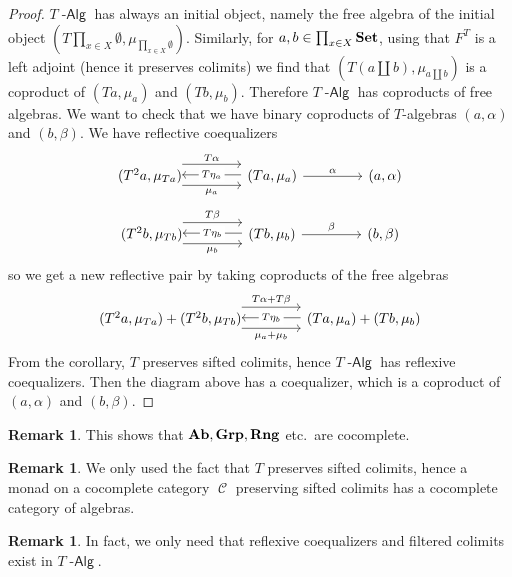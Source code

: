 \documentclass[a4paper,11pt,oneside,openany]{scrbook}
\newcommand{\catname}[1]{{\normalfont\textbf{#1}}}
\DeclareMathOperator{\Alg}{-\mathsf{Alg}}
\newcommand{\Set}{\catname{Set}}
\newcommand{\Ab}{\catname{Ab}}
\DeclareMathOperator{\C}{\mathcal{C}}
\theoremstyle{definition}
\theoremstyle{definition}
\newtheorem{rmk}[thm]{Remark}
\begin{document}
\begin{proof}
$T\Alg$ has always an initial object, namely the free algebra of the initial object $\left(T\prod_{x\in X}\emptyset,\mu_{\prod_{x\in X}\emptyset}\right)$. Similarly, for $a,b\in\prod_{x\in X}\Set$, using that $F^T$ is a left adjoint (hence it preserves colimits) we find that $\left(T\left(a\coprod b\right),\mu_{a\coprod b}\right)$ is a coproduct of $(Ta,\mu_a)$ and $(Tb,\mu_b)$. Therefore $T\Alg$ has coproducts of free algebras. We want to check that we have binary coproducts of $T$-algebras $(a,\alpha)$ and $(b,\beta)$. We have reflective coequalizers
\[
\begin{tikzcd}[column sep=1.5cm]
(T^2a,\mu_{Ta})\hspace{-1.5mm}\arrow[r, shift right=1.5ex, "\mu_a"']  \arrow[r, shift left=2ex, "T\alpha"] & (Ta,\mu_a)\arrow[l, shift right=.25ex, "T\eta_a"description]\arrow[r,"\alpha"]&(a,\alpha)
\end{tikzcd}
\]
\[
\begin{tikzcd}[column sep=1.5cm]
(T^2b,\mu_{Tb})\hspace{-1.5mm}\arrow[r, shift right=1.5ex, "\mu_b"']  \arrow[r, shift left=2ex, "T\beta"] & (Tb,\mu_b)\arrow[l, shift right=.25ex, "T\eta_b"description]\arrow[r,"\beta"]&(b,\beta)
\end{tikzcd}
\]
so we get a new reflective pair by taking coproducts of the free algebras
\[
\begin{tikzcd}[column sep=1.5cm]
(T^2a,\mu_{Ta})+(T^2b,\mu_{Tb})\hspace{-1.5mm}\arrow[r, shift right=1.5ex, "\mu_a+\mu_b"']  \arrow[r, shift left=2ex, "T\alpha+T\beta"] & (Ta,\mu_a)+(Tb,\mu_b)\arrow[l, shift right=.25ex, "T\eta_b"description]
\end{tikzcd}
\]
From the corollary, $T$ preserves sifted colimits, hence $T\Alg$ has reflexive coequalizers. Then the diagram above has a coequalizer, which is a coproduct of $(a,\alpha)$ and $(b,\beta)$. 
\end{proof}
\begin{rmk}
	This shows that $\Ab,\mathbf{Grp},\mathbf{Rng}$ etc.\ are cocomplete.
\end{rmk}
\begin{rmk}
	We only used the fact that $T$ preserves sifted colimits, hence a monad on a cocomplete category $\C$ preserving sifted colimits has a cocomplete category of algebras.
\end{rmk}
\begin{rmk}
	In fact, we only need that reflexive coequalizers and filtered colimits exist in $T\Alg$.
\end{rmk}
\end{document}
